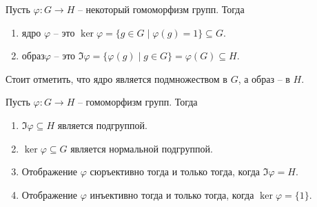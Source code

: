 \begin{definition}
Пусть $\varphi\colon G\to H$ -- некоторый гомоморфизм групп.
Тогда
\begin{enumerate}
\item ядро $\varphi$ -- это $\ker \varphi = \{g\in G \mid \varphi(g) = 1\} \subseteq G$.

\item образ$\varphi$ -- это $\Im \varphi = \{\varphi(g)\mid g\in G\} = \varphi(G) \subseteq H$.
\end{enumerate}
\end{definition}

Стоит отметить, что ядро является подмножеством в $G$, а образ -- в $H$.

\begin{claim}
\label{claim::HomProp}
Пусть $\varphi\colon G\to H$ -- гомоморфизм групп.
Тогда
\begin{enumerate}
\item $\Im \varphi \subseteq H$  является подгруппой.

\item $\ker \varphi \subseteq G$ является нормальной подгруппой.

\item Отображение $\varphi$ сюръективно тогда и только тогда, когда $\Im \varphi = H$.

\item Отображение $\varphi$ инъективно тогда и только тогда, когда $\ker \varphi  = \{1\}$.
\end{enumerate}
\end{claim}

